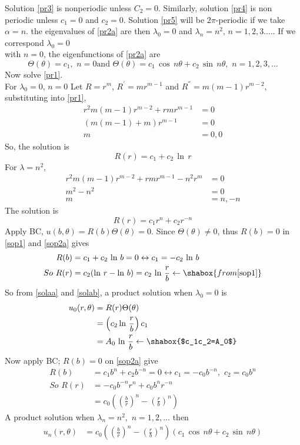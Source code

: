 Solution \eqref{pr3} is nonperiodic unless $C_2=0$. Similarly, solution \eqref{pr4} is non periodic unless $c_1=0$ and $c_2=0$. Solution \eqref{pr5} will be $2\pi$-periodic if we take $\alpha=n$. the eigenvalues of \eqref{pr2a} are then $\lambda_0=0$ and $\lambda_n=n^2,\,n=1,2,3.\ldots$. If we correspond $\lambda_0=0$\\ with $n=0$, the eigenfunctions of \eqref{pr2a} are
\begin{equation}
\Theta(\theta)=c_1,\,\,n=0 \text{and}\,\,\Theta(\theta)=c_1\,\cos\,n\theta+c_2\,\sin\,n\theta,\,\, n=1,2,3,\ldots\label{solaa}
\end{equation}
Now solve \eqref{pr1}. \\
For $\lambda_0=0$, $n=0$
Let $R=r^m$, $R^{'}=mr^{m-1}$ and $R^{''}=m(m-1)r^{m-2}$, substituting into \eqref{pr1},
\begin{align*}
r^2m(m-1)r^{m-2}+rmr^{m-1}&=0\\
(m(m-1)+m)r^{m-1}&=0\\
m&=0,0
\end{align*}
So, the solution is
\begin{equation}
R(r)=c_1+c_2\,\ln\,r\label{sop1}
\end{equation}
For $\lambda=n^2$,
\begin{align*}
r^2m(m-1)r^{m-2}+rmr^{m-1}-n^2r^m&=0\\
m^2-n^2&=0\\
m&=n,-n
\end{align*}
The solution is 
\begin{equation}
R(r)=c_1r^n+c_2r^{-n}\label{sop2a}
\end{equation}
Apply BC, $u(b,\theta)=R(b)\Theta(\theta)=0$. Since $\Theta(\theta)\neq 0$, thus $R(b)=0$ in \eqref{sop1} and \eqref{sop2a} gives
\begin{align}
R(b)&=c_1+c_2\,\ln\,b=0\leftrightarrow c_1=-c_2\,\ln\,b\\
So\,\,R(r)&=c_2(\ln\,r-\ln\,b)=c_2\,\ln\,\frac{r}{b}\leftarrow\shabox{from \eqref{sop1}}\label{solab}
\end{align}
So from \eqref{solaa} and \eqref{solab}, a product solution when $\lambda_0=0$ is
\begin{align}
u_0(r,\theta)&=R(r)\Theta(\theta)\\
&=\left(c_2\ln\,\frac{r}{b}\right)c_1\\
&=A_0\,\ln\,\frac{r}{b}\leftarrow\shabox{$c_1c_2=A_0$}\label{solac}
\end{align}
Now apply BC; $R(b)=0$ on \eqref{sop2a} give
\begin{align}
R(b)&=c_1b^n+c_2b^{-n}=0\leftrightarrow c_1=-c_0b^{-n},\,\,c_2=c_0b^n\\
So\,\,R(r)&=-c_0b^{-n}r^n+c_0b^nr^{-n}\\
&=c_0\left(\left(\frac{b}{r}\right)^n-\left(\frac{r}{b}\right)^n\right)\label{sol3a}
\end{align}
A product solution when $\lambda_n=n^2,\,\,n=1,2,\ldots$ then
\begin{align}
u_n(r,\theta)&=c_0\left(\left(\frac{b}{r}\right)^n-\left(\frac{r}{b}\right)^n\right)(c_1\,\cos\,n\theta+c_2\,\sin\,n\theta)\label{sol3b}
\end{align}

